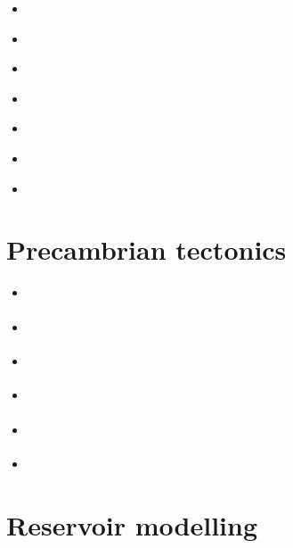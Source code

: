 \begin{scriptsize}
\begin{itemize}
\item[\nineteeneightysix] 
\textcite{scst86} 
\item[\nineteeneightyeight] 
\textcite{scot88} 
\item[\nineteenninetythree] 
\textcite{spie93} 
\item[\twothousand] 
\textcite{scth00b} 
\item[\twothousandthirteen] 
\textcite{dyge13} 
\item[\twothousandnineteen] 
\textcite{eitp19} 
\item[\twothousandtwenty] 
\textcite{eitf20} 
\end{itemize}
\end{scriptsize}

\section{Precambrian tectonics}

\begin{scriptsize}
\begin{itemize}
\item[\nineteenninetyfour] 
\textcite{guto94} 
\item[\twothousandthree] 
\textcite{wemv03} 
\item[\twothousandten] 
\textcite{sigb10} 
\item[\twothousandeleven] 
\textcite{pege11} 
\item[\twothousandfourteen] 
\textcite{gery14} 
\textcite{gagb14} 
\textcite{sigb14} 
\item[\twothousandtwenty] 
\textcite{poyd20} 
\end{itemize}
\end{scriptsize}



\section{Reservoir modelling}

